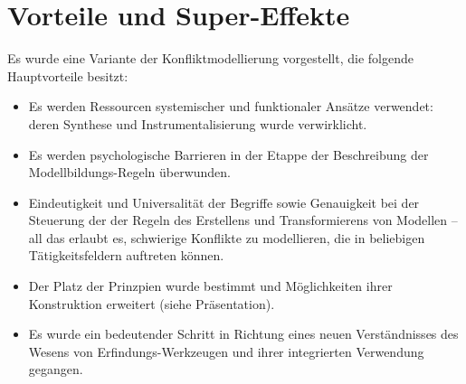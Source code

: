 \documentclass[11pt,a4paper]{article}
\begin{document}
\section*{Vorteile und Super-Effekte}
Es wurde eine Variante der Konfliktmodellierung vorgestellt, die folgende
Hauptvorteile besitzt:
\begin{itemize}
\item Es werden Ressourcen systemischer und funktionaler Ansätze verwendet:
  deren Synthese und Instrumentalisierung wurde verwirklicht.
\item Es werden psychologische Barrieren in der Etappe der Beschreibung der
  Modellbildungs-Regeln überwunden.
\item Eindeutigkeit und Universalität der Begriffe sowie Genauigkeit bei der
  Steuerung der der Regeln des Erstellens und Transformierens von Modellen --
  all das erlaubt es, schwierige Konflikte zu modellieren, die in beliebigen
  Tätigkeitsfeldern auftreten können.
\item Der Platz der Prinzpien wurde bestimmt und Möglichkeiten ihrer
  Konstruktion erweitert (siehe Präsentation).
\item Es wurde ein bedeutender Schritt in Richtung eines neuen Verständnisses
  des Wesens von Erfindungs-Werkzeugen und ihrer integrierten Verwendung
  gegangen.
\end{itemize}
\end{document}
